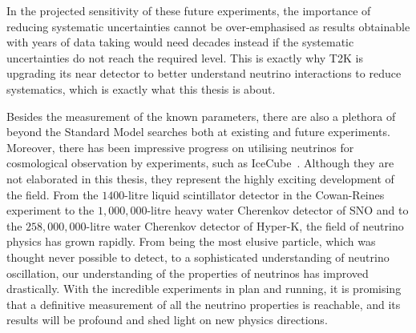 In the projected sensitivity of these future experiments, the importance of reducing systematic uncertainties cannot be over-emphasised as results obtainable with years of data taking would need decades instead if the systematic uncertainties do not reach the required level.
This is exactly why T2K is upgrading its near detector to better understand neutrino interactions to reduce systematics, which is exactly what this thesis is about.

Besides the measurement of the known parameters, there are also a plethora of beyond the Standard Model searches both at existing and future experiments.
Moreover, there has been impressive progress on utilising neutrinos for cosmological observation by experiments, such as IceCube~\cite{IceCube:2023ame}.
Although they are not elaborated in this thesis, they represent the highly exciting development of the field.
From the $1400$-litre liquid scintillator detector in the Cowan-Reines experiment to the $1,000,000$-litre heavy water Cherenkov detector of SNO and to the $258,000,000$-litre water Cherenkov detector of Hyper-K, the field of neutrino physics has grown rapidly.
From being the most elusive particle, which was thought never possible to detect, to a sophisticated understanding of neutrino oscillation, our understanding of the properties of neutrinos has improved drastically.
With the incredible experiments in plan and running, it is promising that a definitive measurement of all the neutrino properties is reachable, and its results will be profound and shed light on new physics directions.
